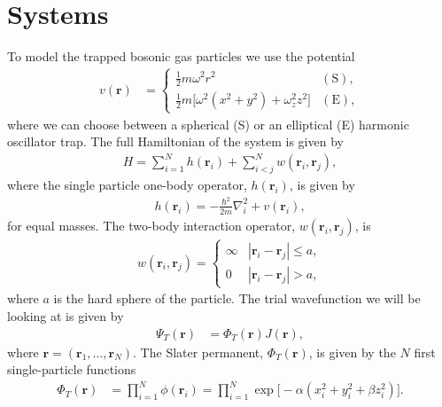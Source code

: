 \documentclass[
    a4paper, aps, twocolumn, floatfix, superscriptaddress,
    nofootinbib]{revtex4-1}
\newcommand{\vf}{\mathbf}
\newcommand{\1}{\mathds{1}}
\newcommand{\half}{\frac{1}{2}}
\begin{document}
\section{Systems}
    To model the trapped bosonic gas particles we use the potential
    \begin{align}
        v(\vf{r})
        &=
        \begin{cases}
            \half m\omega^2r^2 & (\text{S}), \\
            \half m \bigl[
                \omega^2(x^2 + y^2) + \omega_z^2z^2
            \bigr] & (\text{E}),
        \end{cases}
    \end{align}
    where we can choose between a spherical (S) or an elliptical (E) harmonic
    oscillator trap. The full Hamiltonian of the system is given by
    \begin{align}
        H = \sum_{i = 1}^{N}h(\vf{r}_i) + \sum_{i < j}^{N}w(\vf{r}_i, \vf{r}_j),
    \end{align}
    where the single particle one-body operator, $h(\vf{r}_i)$, is given by
    \begin{align}
        h(\vf{r}_i) = -\frac{\hbar^2}{2m}\nabla_i^2
        + v(\vf{r}_i),
    \end{align}
    for equal masses. The two-body interaction operator, $w(\vf{r}_i,
    \vf{r}_j)$, is
    \begin{align}
        w(\vf{r}_i, \vf{r}_j)
        = \begin{cases}
            \infty & |\vf{r}_i - \vf{r}_j| \leq a, \\
            0 & |\vf{r}_i - \vf{r}_j| > a,
        \end{cases}
        \label{eq:two-body_interaction}
    \end{align}
    where $a$ is the hard sphere of the particle.  The trial wavefunction we
    will be looking at is given by
    \begin{align}
        \Psi_T(\vf{r})
        &= \Phi_T(\vf{r})
        J(\vf{r}),
        \label{eq:initial_trial_wavefunction}
    \end{align}
    where $\vf{r} = (\vf{r}_1, \dots, \vf{r}_N)$. The Slater permanent,
    $\Phi_T(\vf{r})$, is given by the $N$ first single-particle functions
    \begin{align}
        \Phi_T(\vf{r})
        &=
        \prod_{i = 1}^N \phi(\vf{r}_i)
        = \prod_{i = 1}^N\exp\bigl[
            -\alpha(x_i^2 + y_i^2 + \beta z_i^2)
        \bigr].
    \end{align}
\end{document}
